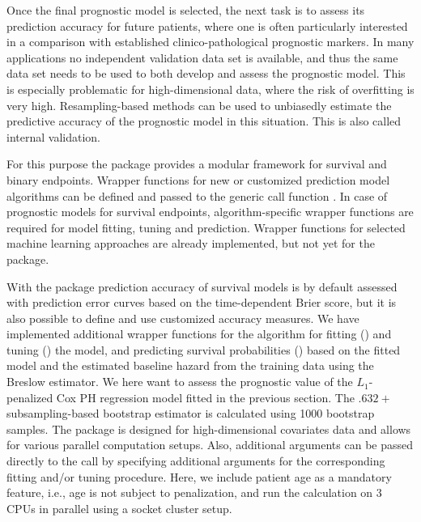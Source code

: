 \documentclass[nojss]{jss}
\begin{document}
Once the final prognostic model is selected, the next task is to assess its prediction accuracy for future patients, where one is often particularly interested in a comparison with established clinico-pathological prognostic markers. In many applications no independent validation data set is available, and thus the same data set needs to be used to both develop and assess the prognostic model. This is especially problematic for high-dimensional data,
where the risk of overfitting is very high. Resampling-based methods can be used to unbiasedly estimate the predictive accuracy 
of the prognostic model in this situation. This is also called internal validation.

For this purpose the  package  \citep{Porz2009,peperr} provides a modular framework for survival and binary endpoints. %
Wrapper functions for new or customized prediction model algorithms can be defined and passed to the generic call function .  
In case of prognostic models for survival endpoints, algorithm-specific wrapper functions are required for model fitting, tuning and prediction. Wrapper functions for selected machine learning approaches are already implemented, but not yet for the  package.

With the  package prediction accuracy of survival models is by default assessed with prediction error curves based on the time-dependent Brier score, but it is also possible to define and use customized accuracy measures. We have implemented additional wrapper functions for the  algorithm for fitting () and tuning () the model, and predicting survival probabilities () based on the fitted model and the estimated baseline hazard from the training data using the Breslow estimator. We here want to assess the prognostic value of the $L_1$-penalized Cox PH regression model fitted in the previous section. The $.632+$ subsampling-based bootstrap estimator is calculated using 1000 bootstrap samples. The  package is designed for high-dimensional covariates data and allows for various parallel computation setups.
Also, additional arguments can be passed directly to the  call by specifying additional arguments for the corresponding fitting and/or tuning procedure.
Here, we include patient age as a mandatory feature, i.e., age is not subject to penalization, and 
run the calculation on 3 CPUs in parallel using a socket cluster setup. 
\end{document}
